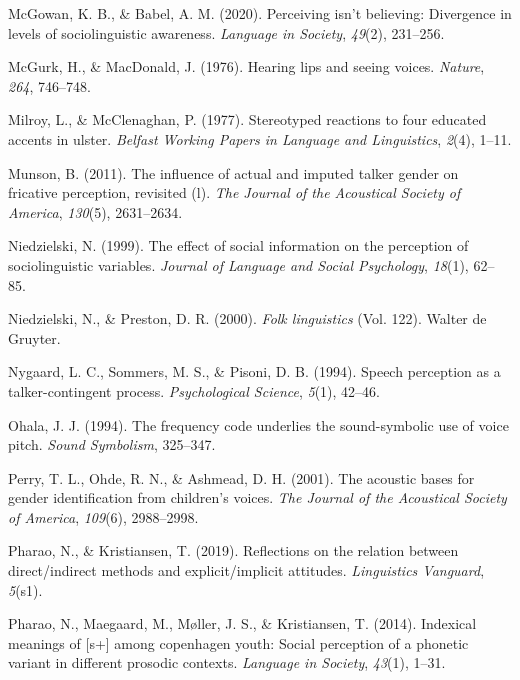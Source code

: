\documentclass[
  letterpaper,
  DIV=11,
  numbers=noendperiod]{scrartcl}
\newlength{\cslhangindent}
\newenvironment{CSLReferences}[2] %
 {\begin{list}{}{%
  \setlength{\itemindent}{0pt}
  \setlength{\leftmargin}{0pt}
  \setlength{\parsep}{0pt}
  \ifodd #1
   \setlength{\leftmargin}{\cslhangindent}
   \setlength{\itemindent}{-1\cslhangindent}
  \fi
  \setlength{\itemsep}{#2\baselineskip}}}
 {\end{list}}
\begin{document}
\begin{CSLReferences}{1}{0}
McGowan, K. B., \& Babel, A. M. (2020). Perceiving isn't believing:
Divergence in levels of sociolinguistic awareness. \emph{Language in
Society}, \emph{49}(2), 231--256.

McGurk, H., \& MacDonald, J. (1976). Hearing lips and seeing voices.
\emph{Nature}, \emph{264}, 746--748.

Milroy, L., \& McClenaghan, P. (1977). Stereotyped reactions to four
educated accents in ulster. \emph{Belfast Working Papers in Language and
Linguistics}, \emph{2}(4), 1--11.

Munson, B. (2011). The influence of actual and imputed talker gender on
fricative perception, revisited (l). \emph{The Journal of the Acoustical
Society of America}, \emph{130}(5), 2631--2634.

Niedzielski, N. (1999). The effect of social information on the
perception of sociolinguistic variables. \emph{Journal of Language and
Social Psychology}, \emph{18}(1), 62--85.

Niedzielski, N., \& Preston, D. R. (2000). \emph{Folk linguistics} (Vol.
122). Walter de Gruyter.

Nygaard, L. C., Sommers, M. S., \& Pisoni, D. B. (1994). Speech
perception as a talker-contingent process. \emph{Psychological Science},
\emph{5}(1), 42--46.

Ohala, J. J. (1994). The frequency code underlies the sound-symbolic use
of voice pitch. \emph{Sound Symbolism}, 325--347.

Perry, T. L., Ohde, R. N., \& Ashmead, D. H. (2001). The acoustic bases
for gender identification from children's voices. \emph{The Journal of
the Acoustical Society of America}, \emph{109}(6), 2988--2998.

Pharao, N., \& Kristiansen, T. (2019). Reflections on the relation
between direct/indirect methods and explicit/implicit attitudes.
\emph{Linguistics Vanguard}, \emph{5}(s1).

Pharao, N., Maegaard, M., Møller, J. S., \& Kristiansen, T. (2014).
Indexical meanings of {[}s+{]} among copenhagen youth: Social perception
of a phonetic variant in different prosodic contexts. \emph{Language in
Society}, \emph{43}(1), 1--31.


\end{CSLReferences}
\end{document}
